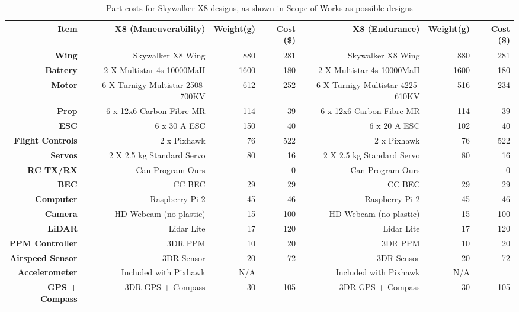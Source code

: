 \begin{landscape}
\begin{table}[!htbp]
	\centering
	\caption{Part costs for Skywalker X8 designs, as shown in Scope of Works as possible designs}
	\begin{tabular}{|r|r|r|r|r|r|r|}
		\hline 
		\textbf{Item} & \textbf{X8 (Maneuverability)} & \textbf{Weight(g)} & \textbf{Cost (\$)} & \textbf{X8 (Endurance)} & \textbf{Weight(g)} & \textbf{Cost (\$)}\\
		\hline
		\textbf{Wing} & Skywalker X8 Wing & 880 & 281 & Skywalker X8 Wing & 880 & 281\\
		\hline
		\textbf{Battery} & 2 X Multistar 4s 10000MaH & 1600 & 180 & 2 X Multistar 4s 10000MaH & 1600 & 180\\
		\hline
		\textbf{Motor} & 6 X Turnigy Multistar 2508-700KV & 612 & 252 & 6 X Turnigy Multistar 4225-610KV & 516 & 234\\
		\hline
		\textbf{Prop} & 6 x 12x6 Carbon Fibre MR & 114 & 39 & 6 x 12x6 Carbon Fibre MR & 114 & 39\\
		\hline
		\textbf{ESC} & 6 x 30 A ESC & 150 & 40 & 6 x 20 A ESC & 102 & 40\\
		\hline
		\textbf{Flight Controls} & 2 x Pixhawk & 76 & 522 & 2 x Pixhawk & 76 & 522\\
		\hline
		\textbf{Servos} & 2 X 2.5 kg Standard Servo & 80 & 16 & 2 X 2.5 kg Standard Servo & 80 & 16\\
		\hline
		\textbf{RC TX/RX} & Can Program Ours & & 0 & Can Program Ours & & 0\\
		\hline
		\textbf{BEC} & CC BEC & 29 & 29 & CC BEC & 29 & 29\\
		\hline
		\textbf{Computer} & Raspberry Pi 2 & 45 & 46 & Raspberry Pi 2 & 45 & 46\\
		\hline
		\textbf{Camera} & HD Webcam (no plastic) & 15 & 100 & HD Webcam (no plastic) & 15 & 100\\
		\hline
		\textbf{LiDAR} & Lidar Lite & 17 & 120 & Lidar Lite & 17 & 120\\
		\hline
		\textbf{PPM Controller} & 3DR PPM  & 10 & 20 & 3DR PPM & 10 & 20\\
		\hline
		\textbf{Airspeed Sensor} & 3DR Sensor & 20 & 72 & 3DR Sensor & 20 & 72\\
		\hline
		\textbf{Accelerometer} & Included with Pixhawk & N/A & & Included with Pixhawk & N/A & \\
		\hline
		\textbf{GPS + Compass} & 3DR GPS + Compass & 30 & 105 & 3DR GPS + Compass & 30 & 105\\

\end{tabular}
\end{table}
\end{landscape}
